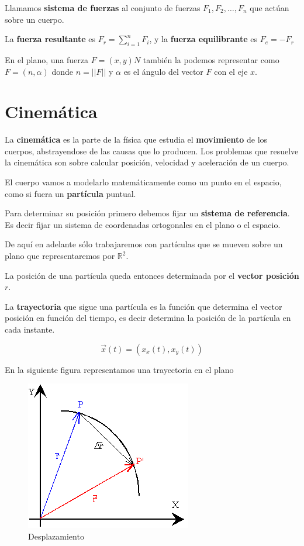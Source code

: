 Llamamos \textbf{sistema de fuerzas} al conjunto de fuerzas $F_1, F_2, \ldots, F_n$ que actúan sobre un cuerpo.

La \textbf{fuerza resultante}  es $F_r = \sum_{i=1}^n F_i $, y la \textbf{fuerza equilibrante}  es $F_e = - F_r$

En el plano, una fuerza $F = (x,y)N$ también la podemos representar como $F = (n,\alpha)$ donde $n = ||F||$ y $\alpha$ es el ángulo del vector $F$ con el eje $x$.

\section{Cinemática} 

La \textbf{cinemática} es la parte de la física que estudia el \textbf{movimiento} de los cuerpos, abstrayendose de las causas que lo producen.  Los problemas que resuelve la cinemática son sobre calcular posición, velocidad y aceleración de un cuerpo.

El cuerpo vamos a modelarlo matemáticamente como un punto en el espacio, como si fuera un \textbf{partícula} puntual.

Para determinar su posición primero debemos fijar un \textbf{sistema de referencia}.  Es decir fijar un sistema de coordenadas ortogonales en el plano o el espacio.

De aquí en adelante sólo trabajaremos con partículas que se mueven sobre un plano que representaremos por $\mathbb{R}^2$.

La posición de una partícula queda entonces determinada por el \textbf{vector posición} $r$.

La \textbf{trayectoria}  que sigue una partícula es la función que determina el vector posición en función del tiempo, es decir determina la posición de la partícula en cada instante.

$$ \vec{x}(t) = (x_x(t), x_y(t))$$

En la siguiente figura representamos una trayectoria en el plano

\begin{figure}[h]
\centering\includegraphics[scale=0.5]{images/01_precalculo/desplazamiento.png}
\caption{Desplazamiento}
\end{figure}


